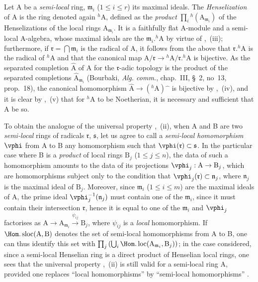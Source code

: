\begin{env}[18.6.7]
\label{IV.18.6.7}
Let A be a \emph{semi-local} ring, $\mathfrak{m}_i$ ($1\leq i\leq r$) its maximal ideals.
The \emph{Henselization} of A is the ring denoted again ${}^h\!\mathrm{A}$, defined as the \emph{product} $\prod_i{}^h(\mathrm{A}_{\mathfrak{m}_i})$ of the Henselizations of the local rings $\mathrm{A}_{\mathfrak{m}_i}$.
It is a faithfully flat A-module and a semi-local A-algebra, whose maximal ideals are the $\mathfrak{m}_i.{}^h\!\mathrm{A}$ by virtue of ,~(iii);
furthermore, if $\mathfrak{r}=\bigcap\mathfrak{m}_i$ is the radical of A, it follows from the above that $\mathfrak{r}.{}^h\!\mathrm{A}$
is the radical of ${}^h\!\mathrm{A}$ and that the canonical map $\mathrm{A}/\mathfrak{r}\to{}^h\!\mathrm{A}/\mathfrak{r}.{}^h\!\mathrm{A}$ is bijective.
As the separated completion $\hat{\mathrm{A}}$ of A for the $\mathfrak{r}$-adic topology is the product of the separated completions $\hat{\mathrm{A}}_{\mathfrak{m}_i}$ (Bourbaki, \emph{Alg. comm.}, chap.~III, \S~2, no~13, prop.~18), the canonical homomorphism $\hat{\mathrm{A}}\to({}^h\!\mathrm{A})\hat{\phantom{x}}$ is bijective by ,~(iv), and it is clear by ,~(v) that for ${}^h\!\mathrm{A}$ to be Noetherian, it is necessary and sufficient that A be so.

To obtain the analogue of the universal property ,~(ii), when A and B are two \emph{semi-local} rings of radicals $\mathfrak{r}$, $\mathfrak{s}$, let us agree to call a \emph{semi-local homomorphism} $\vphi$ from A to B any homomorphism such that $\vphi(\mathfrak{r})\subset\mathfrak{s}$.
In the particular case where B is a \emph{product} of local rings $\mathrm{B}_j$ ($1\leq j\leq n$), the data of such a homomorphism amounts to the data of its projections $\vphi_j:\mathrm{A}\to\mathrm{B}_j$, which are homomorphisms subject only to the condition that $\vphi_j(\mathfrak{r})\subset\mathfrak{n}_j$, where $\mathfrak{n}_j$ is the maximal ideal of $\mathrm{B}_j$.
Moreover, since $\mathfrak{m}_i$ ($1\leq i\leq m$) are the maximal ideals of A, the prime ideal $\vphi_j^{-1}(\mathfrak{n}_j)$ must contain one of the $\mathfrak{m}_i$, since it must contain their intersection $\mathfrak{r}$, hence it is equal to one of the $\mathfrak{m}_i$ and $\vphi_j$ factorises as $\mathrm{A}\to\mathrm{A}_{\mathfrak{m}_i}\xrightarrow{\psi_{ij}}\mathrm{B}_j$, where $\psi_{ij}$ is a \emph{local} homomorphism.
If $\Hom.\operatorname{sloc}(\mathrm{A},\mathrm{B})$ denotes the set of semi-local homomorphisms from A to B, one can thus identify this set with $\prod_j\left(\bigcup_i\Hom.\operatorname{loc}(\mathrm{A}_{\mathfrak{m}_i},\mathrm{B}_j)\right)$;
in the case considered, since a semi-local Henselian ring is a direct product of Henselian local rings, one sees that the universal property ,~(ii) is still valid for a semi-local ring A, provided one replaces ``local homomorphisms'' by ``semi-local homomorphisms'' .
\end{env}

